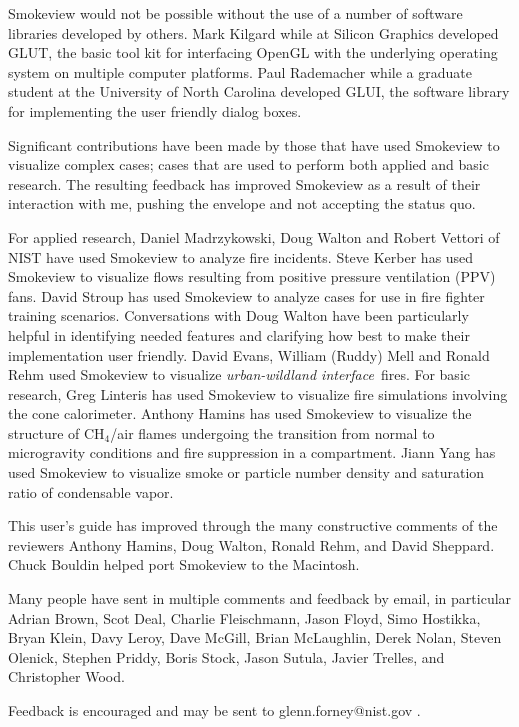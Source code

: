 \documentclass[11pt,twoside]{book}
\begin{document}
Smokeview would not be possible without the use of a number of
software libraries developed by others.  Mark Kilgard while at
Silicon Graphics developed GLUT, the basic tool kit for
interfacing OpenGL with the underlying operating system on
multiple computer platforms. Paul Rademacher while a graduate
student at the University of North Carolina developed GLUI, the
software library for implementing the user friendly dialog boxes.

Significant contributions have been made by those that have used
Smokeview to visualize complex cases; cases that are used to
perform both applied and basic research.  The resulting feedback
has improved Smokeview as a result of their interaction with me,
pushing the envelope and not accepting the status quo.

For applied research, Daniel Madrzykowski, Doug Walton and Robert
Vettori of NIST have used Smokeview to analyze fire incidents.
Steve Kerber has used Smokeview to visualize flows resulting from
positive pressure ventilation (PPV) fans. David Stroup has used Smokeview to analyze cases for use
in fire fighter training scenarios.  Conversations with Doug
Walton have been particularly helpful in identifying needed
features and clarifying how best to make their implementation user
friendly.  David Evans, William (Ruddy) Mell and Ronald Rehm used
Smokeview to visualize {\em urban-wildland interface}\ fires.   For
basic research, Greg Linteris has used Smokeview to visualize fire
simulations involving the cone calorimeter. Anthony Hamins has
used Smokeview to visualize the structure of CH$_4$/air flames
undergoing the transition from normal to microgravity conditions
and fire suppression in a compartment. Jiann Yang has used
Smokeview to visualize smoke or particle number density and
saturation ratio of condensable vapor.

This user's guide has improved through the many constructive
comments of the reviewers Anthony Hamins, Doug Walton, Ronald
Rehm, and David Sheppard. Chuck Bouldin helped port Smokeview to
the Macintosh.

Many people have sent in multiple comments and feedback by email,
in particular Adrian Brown, Scot Deal, Charlie Fleischmann, Jason
Floyd, Simo Hostikka, Bryan Klein, Davy Leroy, Dave McGill, Brian
McLaughlin, Derek Nolan, Steven Olenick, Stephen Priddy, Boris
Stock, Jason Sutula, Javier Trelles, and Christopher Wood.

Feedback is encouraged and may be sent to glenn.forney@nist.gov .
\end{document}
